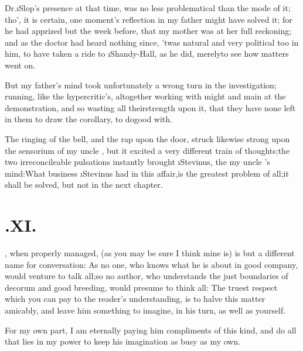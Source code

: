 \documentclass[twoside]{article}
\begin{document}
Dr.\@ \i{Slop}’s presence at that time, was no less
problematical than the mode of it; tho’, it is certain, one
moment’s reflection in my father might have solved it; for he
had apprized \drslop but the week before, that my mother was at her full reckoning;
and as the doctor had heard nothing since, ’twas natural and
very political too in him, to have taken a ride to
\i{Shandy-Hall}, as he did, merely\break to see how matters went
on.

But my father’s mind took unfortunately a wrong turn in
the investigation; running, like the hypercritic’s,
altogether
working with might and main at the de\-monstration,
and so wasting all their\break strength upon it, that they have none left
in them to draw the corollary, to do\break good with.

The ringing of the bell, and the rap upon the door, struck
likewise strong\break
upon the sensorium of my uncle \toby,\tsk\break 
but it excited a very different train of
thoughts;\tsk the two irreconcileable pulsations instantly
brought \i{Stevinus}, the\break
{}
my uncle \toby's mind:\tsk What business
\i{Stevinus} had in this affair,\tsk is the greatest
problem of all;\tsh it shall be solved,\tsk\break
but not in the next chapter.

\vskip 30pt
\newpage

\section{\chapstrut{}.\enspace  XI.}

, when properly managed, (as
you may be sure I think mine is) is but a different name for
conversation: As no one, who knows what he is about in good
company, would venture to talk all;\tsk so no author, who
understands the just boundaries of decorum and good breeding, would
presume to think all: The truest respect which you can pay to the
reader’s understanding, is to halve this matter amicably, and
leave him something to imagine, in his turn,\break
as well as yourself.

For my own part, I am eternally paying him compliments of this
kind, and do all that lies in my power to keep his\break
imagination as busy as my own.
\end{document}
